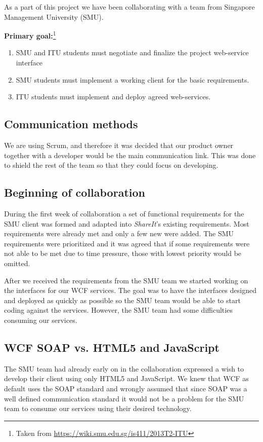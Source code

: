 \documentclass[../report.tex]{subfiles}
\begin{document}
\graphicspath{{img/}{../img/}}

As a part of this project we have been collaborating with a team from Singapore Management University (SMU).

\textbf{Primary goal:}\footnote{Taken from \url{https://wiki.smu.edu.sg/is411/2013T2-ITU}}
\begin{enumerate}[label=\bfseries G\arabic*:]
\item SMU and ITU students must negotiate and finalize the project web-service interface
\item SMU students must implement a working client for the basic requirements.
\item ITU students must implement and deploy agreed web-services.
\end{enumerate}

\subsection{Communication methods}
We are using Scrum, and therefore it was decided that our product owner together with a developer would be the main communication link.
This was done to shield the rest of the team so that they could focus on developing.
\subsection{Beginning of collaboration}
During the first week of collaboration a set of functional requirements for the SMU client was formed and adapted into \textit{ShareIt}'s existing requirements. 
Most requirements were already met and only a few new were added. 
The SMU requirements were prioritized and it was agreed that if  some requirements were not able to be met due to time pressure, those with lowest priority would be omitted.

After we received the requirements from the SMU team we started working on the interfaces for our WCF services. 
The goal was to have the interfaces designed and deployed as quickly as possible so the SMU team would be able to start coding against the services.
However, the SMU team had some difficulties consuming our services.
\subsection{WCF SOAP vs. HTML5 and JavaScript}
The SMU team had already early on in the collaboration expressed a wish to develop their client using only HTML5 and JavaScript. 
We knew that WCF as default uses the SOAP standard and wrongly assumed that since SOAP was a well defined communication standard it would not be a problem for the SMU team to consume our services using their desired technology.
\end{document}
